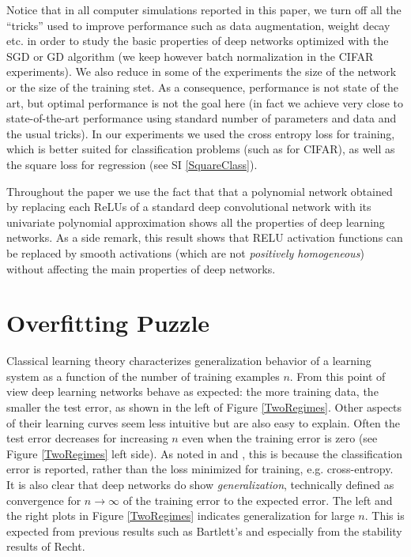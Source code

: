 \documentclass[10pt]{article}
\begin{document}


Notice that in all computer simulations reported in this paper, we
turn off all the ``tricks'' used to improve performance such as data
augmentation, weight decay etc. in order to study the basic properties
of deep networks optimized with the SGD or GD algorithm (we keep
however batch normalization in the CIFAR experiments). We also reduce
in some of the experiments the size of the network or the size of the
training stet. As a consequence, performance is not state of the art,
but optimal performance is not the goal here (in fact we achieve very
close to state-of-the-art performance using standard number of
parameters and data and the usual tricks). In our experiments we used
the cross entropy loss for training, which is better suited for
classification problems (such as for CIFAR), as well as the square
loss for regression (see SI \ref{SquareClass}).

Throughout the paper we  use the fact that that a polynomial
network obtained by replacing each ReLUs of a standard deep
convolutional network with its univariate polynomial approximation
shows all the properties of deep learning networks. As a side remark,
this result shows that RELU activation functions can be replaced by
smooth activations (which are not {\it positively homogeneous})
without affecting the main properties of deep networks.

\section{Overfitting Puzzle}

Classical learning theory characterizes generalization behavior of a
learning system as a function of the number of training examples
$n$. From this point of view deep learning networks behave as
expected: the more training data, the smaller the test error, as shown
in the left of Figure \ref{TwoRegimes}. Other aspects of their
learning curves seem less intuitive but are also easy to explain.
Often the test error decreases for increasing $n$ even when the
training error is zero (see Figure \ref{TwoRegimes} left side). As
noted in \cite{2017arXiv171010345S} and \cite{RosascoRecht2017}, this
is because the classification error is reported, rather than the loss
minimized for training, e.g.  cross-entropy. It is also clear that
deep networks do show {\it generalization}, technically defined as
convergence for $n \to \infty$ of the training error to the expected
error.  The left and the right plots in Figure \ref{TwoRegimes}
indicates generalization for large $n$. This is expected from previous
results such as Bartlett's\cite{AntBartlett2002} and especially from
the stability results of Recht\cite{DBLP:journals/corr/HardtRS15}.
\end{document}
